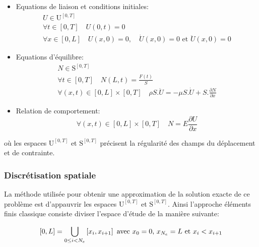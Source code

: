 \documentclass[fleqn]{article}
\begin{document}
\begin{itemize}
	\item Equations de liaison et conditions initiales:
		\begin{equation}
			\begin{array}{l}
				U \in \mathrm{U}^{\left[ 0, T \right]} \\
				\forall t \in \left[ 0,T \right] \quad U(0 ,t)=0 \\
				\forall x \in \left[0,L\right]  \quad U(x,0)=0, \quad \dot{U}(x,0)=0 \mbox{ et } \ddot{U}(x,0)=0
			\end{array}
			\label{eq:CA}
		\end{equation}
	\item Equations d'équilibre:
		\begin{equation}
			\begin{array}{l}
				N \in \mathrm{S}^{\left[ 0, T \right]} \\
				\forall t \in \left[0,T\right] \quad N(L,t)=\frac{F(t)}{S}\\
				\forall (x,t) \in \left[0,L\right] \times \left[ 0,T \right]  \quad \rho S.\ddot{U} = -\mu S.\dot{U} + S.\frac{\partial N}{\partial x} 
			\end{array}
			\label{eq:SA}
		\end{equation}
	\item Relation de comportement:
		\begin{equation}
			\forall (x,t) \in  \left[ 0,L \right] \times \left[ 0,T \right] \quad  N = E \frac{\partial U}{\partial x}
			\label{eq:rdc}
		\end{equation}
\end{itemize}
où les espaces $\mathrm{U}^{\left[ 0, T \right]}$ et $\mathrm{S}^{\left[ 0, T \right]}$ précisent la régularité des champs du déplacement et de contrainte.


\subsubsection{Discrétisation spatiale}

La méthode utilisée pour obtenir une approximation de la solution exacte de ce problème est d'appauvrir les espaces $\mathrm{U}^{\left[ 0, T \right]}$ et $\mathrm{S}^{\left[ 0, T \right]}$. Ainsi l'approche éléments finis classique consiste diviser l'espace d'étude de la manière suivante:

\begin{equation*}
	\left[ 0,L \right]=  \bigcup_{0\leq i<N_e}   \left[ x_i,x_{i+1}\right] \mbox{ avec } x_0=0\mbox{, } x_{N_e}=L  \mbox{ et }  x_i<x_{i+1}\\
\end{equation*}
\end{document}
